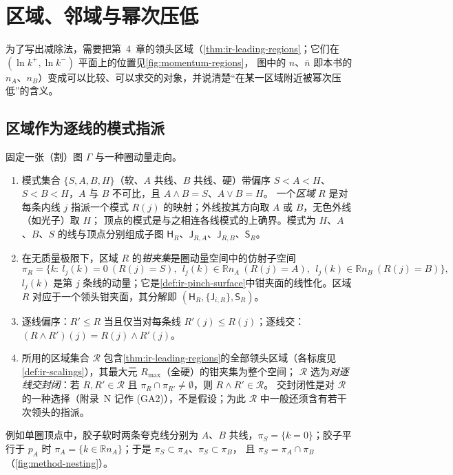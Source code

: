 \section{区域、邻域与幂次压低}\label{sec:method-regions}

为了写出减除法，需要把第~4~章的领头区域（\cref{thm:ir-leading-regions}；它们在 $(\ln k^+,\ln k^-)$ 平面上的位置见\cref{fig:momentum-regions}，
图中的 $n$、$\bar n$ 即本书的 $n_A$、$n_B$）变成可以比较、可以求交的对象，并说清楚“在某一区域附近被幂次压低”的含义。

\subsection{区域作为逐线的模式指派}

\begin{definition}[区域：逐线模式指派与偏序]\label{def:method-regions}
固定一张（割）图 $\Gamma$ 与一种圈动量走向。
\begin{enumerate}[label=(\roman*),leftmargin=2em,itemsep=1pt,topsep=2pt]
\item 模式集合 $\{S,A,B,H\}$（软、$A$ 共线、$B$ 共线、硬）带偏序 $S<A<H$、$S<B<H$，$A$ 与 $B$ 不可比，且 $A\wedge B=S$、$A\vee B=H$。
  一个\emph{区域} $R$ 是对每条内线 $j$ 指派一个模式 $R(j)$ 的映射；外线按其方向取 $A$ 或 $B$，无色外线（如光子）取 $H$；
  顶点的模式是与之相连各线模式的上确界。模式为 $H$、$A$、$B$、$S$ 的线与顶点分别组成子图 $\mathsf H_R$、$\mathsf J_{R,A}$、$\mathsf J_{R,B}$、$\mathsf S_R$。
\item 在无质量极限下，区域 $R$ 的\emph{钳夹集}是圈动量空间中的仿射子空间
  \begin{equation}\label{eq:method-pinchset}
  \pi_R=\bigl\{k:\ l_j(k)=0\ (R(j)=S),\ \ l_j(k)\in\mathbb Rn_A\ (R(j)=A),\ \ l_j(k)\in\mathbb Rn_B\ (R(j)=B)\bigr\},
  \end{equation}
  $l_j(k)$ 是第 $j$ 条线的动量；它是\cref{def:ir-pinch-surface}中钳夹面的线性化。区域 $R$ 对应于一个领头钳夹面，其分解即 $(\mathsf H_R,\{\mathsf J_{i,R}\},\mathsf S_R)$。
\item 逐线偏序：$R'\le R$ 当且仅当对每条线 $R'(j)\le R(j)$；逐线交：$(R\wedge R')(j)=R(j)\wedge R'(j)$。
\item 所用的区域集合 $\mathcal R$ 包含\cref{thm:ir-leading-regions}的全部领头区域（各标度见\cref{def:ir-scalings}），其最大元 $R_{\max}$（全硬）的钳夹集为整个空间；
  $\mathcal R$ 选为\emph{对逐线交封闭}：若 $R,R'\in\mathcal R$ 且 $\pi_R\cap\pi_{R'}\neq\emptyset$，则 $R\wedge R'\in\mathcal R$。
  交封闭性是对 $\mathcal R$ 的一种选择（附录~N 记作 (GA2)），不是假设；为此 $\mathcal R$ 中一般还须含有若干次领头的指派。
\end{enumerate}
例如单圈顶点中，胶子软时两条夸克线分别为 $A$、$B$ 共线，$\pi_S=\{k=0\}$；胶子平行于 $p_A$ 时 $\pi_A=\{k\in\mathbb Rn_A\}$；于是 $\pi_S\subset\pi_A$、$\pi_S\subset\pi_B$，
且 $\pi_S=\pi_A\cap\pi_B$（\cref{fig:method-nesting}）。
\end{definition}

